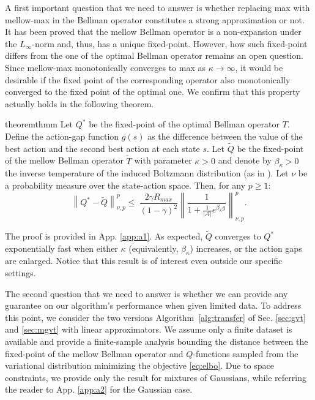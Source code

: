 \documentclass{article}
\newcommand{\wt}[1]{\widetilde{#1}}
\newcommand{\norm}[1]{\left\lVert #1 \right\rVert}
\newcommand{\abs}[1]{\left\lvert #1 \right\rvert}
\begin{document}
A first important question that we need to answer is whether replacing max with mellow-max in the Bellman operator constitutes a strong approximation or not. It has been proved \cite{asadi2017alternative} that the mellow Bellman operator is a non-expansion under the $L_{\infty}$-norm and, thus, has a unique fixed-point.  However, how such fixed-point differs from the one of the optimal Bellman operator remains an open question. Since mellow-max monotonically converges to max as $\kappa \rightarrow \infty$, it would be desirable if the fixed point of the corresponding operator also monotonically converged to the fixed point of the optimal one. We confirm that this property actually holds in the following theorem.

\begin{restatable}{theorem}{thmm} \label{th:mm}
Let $Q^*$ be the fixed-point of the optimal Bellman operator $T$. Define the action-gap function $g(s)$ as the difference between the value of the best action and the second best action at each state $s$. Let $\wt{Q}$ be the fixed-point of the mellow Bellman operator $\wt{T}$ with parameter $\kappa > 0$ and denote by $\beta_{\kappa} > 0$ the inverse temperature of the induced Boltzmann distribution (as in \cite{asadi2017alternative}). Let $\nu$ be a probability measure over the state-action space. Then, for any $p \geq 1$:
\begin{equation}
\norm{Q^*-\wt{Q}}_{\nu,p}^p \leq\ \frac{2\gamma R_{max}}{(1-\gamma)^2}\norm{\frac{1}{1 + \frac{1}{\abs{\mathcal{A}}}e^{\beta_{\kappa} g}}}_{\nu,p}^p.
\end{equation}
\end{restatable}

The proof is provided in App. \ref{app:a1}. As expected, $\wt{Q}$ converges to $Q^*$ exponentially fast when either $\kappa$ (equivalently, $\beta_{\kappa}$) increases, or the action gaps are enlarged. Notice that this result is of interest even outside our specific settings.

The second question that we need to answer is whether we can provide any guarantee on our algorithm's performance when given limited data. To address this point, we consider the two versions Algorithm~\ref{alg:transfer} of Sec. \ref{sec:gvt} and \ref{sec:mgvt} with linear approximators. We assume only a finite dataset is available and provide a finite-sample analysis bounding the distance between the fixed-point of the mellow Bellman operator and $Q$-functions sampled from the variational distribution minimizing the objective \eqref{eq:elbo}. Due to space constraints, we provide only the result for mixtures of Gaussians, while referring the reader to App. \ref{app:a2} for the Gaussian case.
\end{document}
